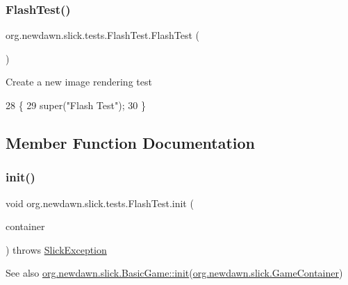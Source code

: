 \subsubsection{\texorpdfstring{Flash\+Test()}{FlashTest()}}
{\footnotesize\ttfamily org.\+newdawn.\+slick.\+tests.\+Flash\+Test.\+Flash\+Test (\begin{DoxyParamCaption}{ }\end{DoxyParamCaption})\hspace{0.3cm}{\ttfamily [inline]}}

Create a new image rendering test 
\begin{DoxyCode}
28                        \{
29         super(\textcolor{stringliteral}{"Flash Test"});
30     \}
\end{DoxyCode}


\subsection{Member Function Documentation}
\mbox{\label{classorg_1_1newdawn_1_1slick_1_1tests_1_1_flash_test_ac889c1ffd5bc065a39c2d83520dbedbd}} 
\subsubsection{\texorpdfstring{init()}{init()}}
{\footnotesize\ttfamily void org.\+newdawn.\+slick.\+tests.\+Flash\+Test.\+init (\begin{DoxyParamCaption}\item[{\mbox{\hyperlink{classorg_1_1newdawn_1_1slick_1_1_game_container}{Game\+Container}}}]{container }\end{DoxyParamCaption}) throws \mbox{\hyperlink{classorg_1_1newdawn_1_1slick_1_1_slick_exception}{Slick\+Exception}}\hspace{0.3cm}{\ttfamily [inline]}}

\begin{DoxySeeAlso}{See also}
\mbox{\hyperlink{classorg_1_1newdawn_1_1slick_1_1_basic_game_a8af0900217e4d389249f71367b22d114}{org.\+newdawn.\+slick.\+Basic\+Game\+::init}}(\mbox{\hyperlink{classorg_1_1newdawn_1_1slick_1_1_game_container}{org.\+newdawn.\+slick.\+Game\+Container}}) 
\end{DoxySeeAlso}


